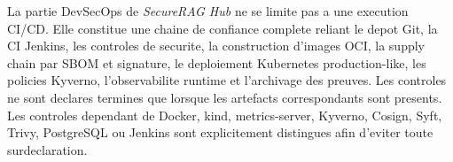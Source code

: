 La partie DevSecOps de \textit{SecureRAG Hub} ne se limite pas a une execution
CI/CD. Elle constitue une chaine de confiance complete reliant le depot Git, la
CI Jenkins, les controles de securite, la construction d'images OCI, la supply
chain par SBOM et signature, le deploiement Kubernetes production-like, les
policies Kyverno, l'observabilite runtime et l'archivage des preuves. Les
controles ne sont declares termines que lorsque les artefacts correspondants
sont presents. Les controles dependant de Docker, kind, metrics-server, Kyverno,
Cosign, Syft, Trivy, PostgreSQL ou Jenkins sont explicitement distingues afin
d'eviter toute surdeclaration.
